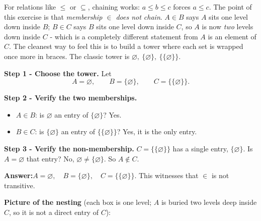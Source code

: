 \documentclass[11pt,a4paper]{article}
\newcommand{\answer}[1]{\begin{answerbox}\centering\textbf{Answer:}\quad #1\end{answerbox}}
\begin{document}
\begin{ideabox}
For relations like $\le$ or $\subseteq$, chaining works: $a\le b\le c$ forces $a\le c$. The point
of this exercise is that \emph{membership $\in$ does not chain}. $A\in B$ says $A$ sits one level
down inside $B$; $B\in C$ says $B$ sits one level down inside $C$, so $A$ is now \emph{two} levels
down inside $C$ - which is a completely different statement from \textquotedbl{}$A$ is an element
of $C$\textquotedbl{}. The cleanest way to feel this is to build a tower where each set is wrapped
once more in braces. The classic tower is $\varnothing,\ \{\varnothing\},\ \{\{\varnothing\}\}$.
\end{ideabox}

\textbf{Step 1 - Choose the tower.}
Let
$$A=\varnothing,\qquad B=\{\varnothing\},\qquad C=\{\{\varnothing\}\}.$$

\textbf{Step 2 - Verify the two memberships.}
\begin{itemize}[leftmargin=1.4cm]
\item $A\in B$: is $\varnothing$ an entry of $\{\varnothing\}$? Yes. \checkmark
\item $B\in C$: is $\{\varnothing\}$ an entry of $\{\{\varnothing\}\}$? Yes, it is the only entry. \checkmark
\end{itemize}

\textbf{Step 3 - Verify the non-membership.}
$C=\{\{\varnothing\}\}$ has a single entry, $\{\varnothing\}$. Is $A=\varnothing$ that entry? No,
$\varnothing\neq\{\varnothing\}$. So $A\notin C$. \checkmark

\answer{$A=\varnothing,\quad B=\{\varnothing\},\quad C=\{\{\varnothing\}\}$. \quad This witnesses that $\in$ is not transitive.}

\medskip
\textbf{Picture of the nesting} (each box is one level; $A$ is buried two levels deep inside $C$,
so it is not a direct entry of $C$):

\begin{center}
\end{center}
\end{document}
